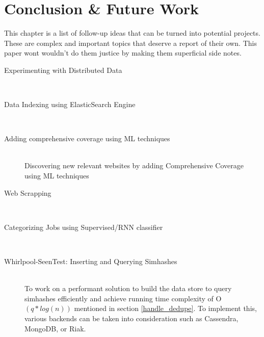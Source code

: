 \chapter{Conclusion \& Future Work}
This chapter is a list of follow-up ideas that can be turned into potential projects. These are complex and
important topics that deserve a report of their own. This paper wont wouldn't do them justice by making
them superficial side notes.

\begin{description}
  \item[Experimenting with Distributed Data] \hfill \\

  \item[Data Indexing using ElasticSearch Engine] \hfill \\

  \item[Adding comprehensive coverage using ML techniques] \hfill \\
    Discovering new relevant websites by adding Comprehensive Coverage using ML techniques
  \item[Web Scrapping] \hfill \\
    \cite{contentExtract}
  \item[Categorizing Jobs using Supervised/RNN classifier] \hfill \\
  \item[Whirlpool-SeenTest: Inserting and Querying Simhashes] \hfill \\
    To work on a performant solution to build the data store to query simhashes efficiently and achieve
    running time complexity of O$(q * log(n))$ mentioned in section \ref{handle_dedupe}. To implement
    this, various backends can be taken into consideration such as Cassendra, MongoDB, or Riak.
    
\end{description}




\pagebreak